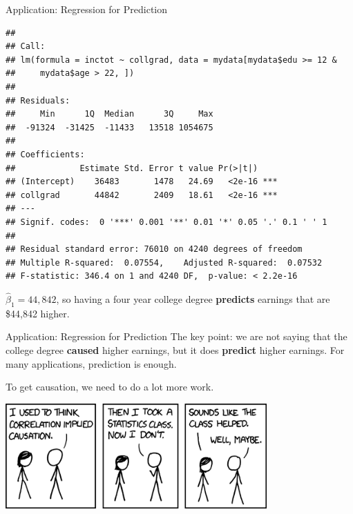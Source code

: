 \documentclass[
  ignorenonframetext,
]{beamer}
\newenvironment{Shaded}{\begin{snugshade}}{\end{snugshade}}
\newcommand{\DecValTok}[1]{\textcolor[rgb]{0.00,0.00,0.81}{#1}}
\newcommand{\FunctionTok}[1]{\textcolor[rgb]{0.00,0.00,0.00}{#1}}
\newcommand{\NormalTok}[1]{#1}
\newcommand{\OtherTok}[1]{\textcolor[rgb]{0.56,0.35,0.01}{#1}}
\newcommand{\SpecialCharTok}[1]{\textcolor[rgb]{0.00,0.00,0.00}{#1}}
\begin{document}
\begin{frame}[fragile]{Application: Regression for Prediction}
\protect\hypertarget{application-regression-for-prediction-8}{}
\tiny

\begin{Shaded}
\end{Shaded}

\begin{verbatim}
## 
## Call:
## lm(formula = inctot ~ collgrad, data = mydata[mydata$edu >= 12 & 
##     mydata$age > 22, ])
## 
## Residuals:
##     Min      1Q  Median      3Q     Max 
##  -91324  -31425  -11433   13518 1054675 
## 
## Coefficients:
##             Estimate Std. Error t value Pr(>|t|)    
## (Intercept)    36483       1478   24.69   <2e-16 ***
## collgrad       44842       2409   18.61   <2e-16 ***
## ---
## Signif. codes:  0 '***' 0.001 '**' 0.01 '*' 0.05 '.' 0.1 ' ' 1
## 
## Residual standard error: 76010 on 4240 degrees of freedom
## Multiple R-squared:  0.07554,    Adjusted R-squared:  0.07532 
## F-statistic: 346.4 on 1 and 4240 DF,  p-value: < 2.2e-16
\end{verbatim}

\normalsize

\(\hat{\beta}_1=44,842\), so having a four year college degree
\textbf{predicts} earnings that are \$44,842 higher.
\end{frame}

\begin{frame}{Application: Regression for Prediction}
\protect\hypertarget{application-regression-for-prediction-9}{}
The key point: we are not saying that the college degree \textbf{caused}
higher earnings, but it does \textbf{predict} higher earnings. For many
applications, prediction is enough.

To get causation, we need to do a lot more work.

\center \includegraphics[width=0.75\textwidth,height=\textheight]{"images/corcauscomic.png"}
\end{frame}
\end{document}
